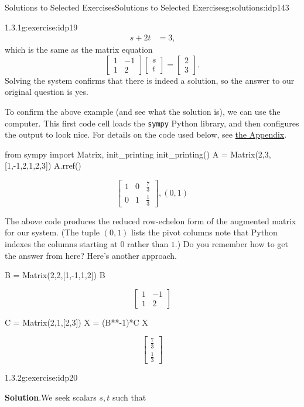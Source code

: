 \documentclass[oneside,10pt,]{book}
\newcommand{\blocktitlefont}{\relax}
\newcommand{\mono}[1]{\texttt{#1}}
\numberwithin{equation}{section}
\newcommand{\bbm}{\begin{bmatrix}}
\newcommand{\ebm}{\end{bmatrix}}
\newcommand{\amp}{&}
\begin{document}
\begin{solutions-chapter}{Solutions to Selected Exercises}{}{Solutions to Selected Exercises}{}{}{g:solutions:idp143}
\begin{inlinesolution}{1.3.1}{}{g:exercise:idp19}
\begin{align*}
s+2t \amp=3 \text{,}
\end{align*}
which is the same as the matrix equation%
\begin{equation*}
\bbm 1\amp -1\\1\amp 2\ebm\bbm s\\t\ebm = \bbm 2\\3\ebm.
\end{equation*}
Solving the system confirms that there is indeed a solution, so the answer to our original question is yes.%
\par
To confirm the above example (and see what the solution is), we can use the computer. This first code cell loads the \mono{sympy} Python library, and then configures the output to look nice. For details on the code used below, see \hyperref[x:appendix:ch-computation]{the Appendix}.%
\begin{sageinput}
from sympy import Matrix, init_printing
init_printing()
A = Matrix(2,3,[1,-1,2,1,2,3])
A.rref()
\end{sageinput}
\begin{sageoutput}
\[\bbm 1\amp 0\amp \frac73\\0\amp 1\amp \frac13\ebm, (0,1)\]
\end{sageoutput}
The above code produces the reduced row-echelon form of the augmented matrix for our system. (The tuple \((0,1)\) lists the pivot columns \textemdash{} note that Python indexes the columns starting at \(0\) rather than \(1\).) Do you remember how to get the answer from here? Here's another approach.%
\begin{sageinput}
B = Matrix(2,2,[1,-1,1,2])
B
\end{sageinput}
\begin{sageoutput}
\[\bbm 1\amp -1\\1\amp 2\ebm\]
\end{sageoutput}
\begin{sageinput}
C = Matrix(2,1,[2,3])
X = (B**-1)*C
X
\end{sageinput}
\begin{sageoutput}
\[\bbm \frac 73\\\frac13\ebm\]
\end{sageoutput}
\end{inlinesolution}%
\begin{inlinesolution}{1.3.2}{}{g:exercise:idp20}%
\par\smallskip%
\noindent\textbf{\blocktitlefont Solution}.\hypertarget{g:solution:idp146-back}{}\quad{}We seek scalars \(s,t\) such that%
\begin{equation*}

\end{equation*}
\end{inlinesolution}
\end{solutions-chapter}
\end{document}
